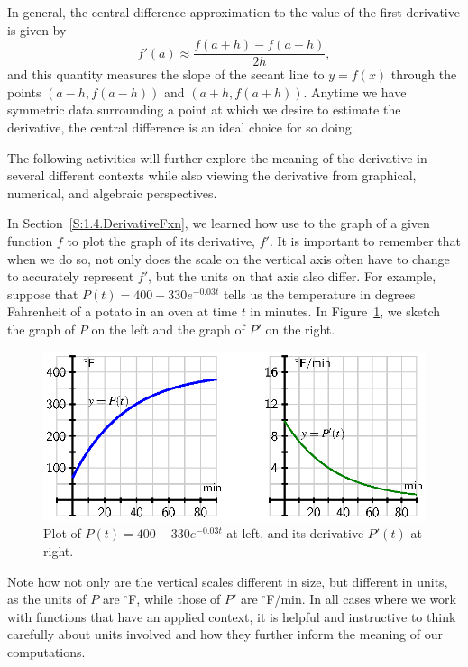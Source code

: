 In general, the central difference approximation to the value of the first derivative is given by 
$$f'(a) \approx \frac{f(a+h) - f(a-h)}{2h},$$
and this quantity measures the slope of the secant line to $y = f(x)$ through the points $(a-h, f(a-h))$ and $(a+h, f(a+h))$. Anytime we have symmetric data surrounding a point at which we desire to estimate the derivative, the central difference is an ideal choice for so doing.

The following activities will further explore the meaning of the derivative in several different contexts while also viewing the derivative from graphical, numerical, and algebraic perspectives.



\newpage





In Section~\ref{S:1.4.DerivativeFxn}, we learned how use to the graph of a given function $f$ to plot the graph of its derivative, $f'$.  It is important to remember that when we do so, not only does the scale on the vertical axis often have to change to accurately represent $f'$, but the units on that axis also differ.  For example, suppose that $P(t) = 400-330e^{-0.03t}$ tells us the temperature in degrees Fahrenheit of a potato in an oven at time $t$ in minutes.  In Figure~\ref{F:1.5.PPprime}, we sketch the graph of $P$ on the left and the graph of $P'$ on the right.  

\begin{figure}[h]
\begin{center}
\includegraphics{figures/1_5_PPprimeplot.eps}
\caption{Plot of $P(t) = 400-330e^{-0.03t}$ at left, and its derivative $P'(t)$ at right.}\label{F:1.5.PPprime}
\end{center}
\end{figure}

Note how not only are the vertical scales different in size, but different in units, as the units of $P$ are $^{\circ}$F, while those of $P'$ are $^{\circ}$F/min.  In all cases where we work with functions that have an applied context, it is helpful and instructive to think carefully about units involved and how they further inform the meaning of our computations.

